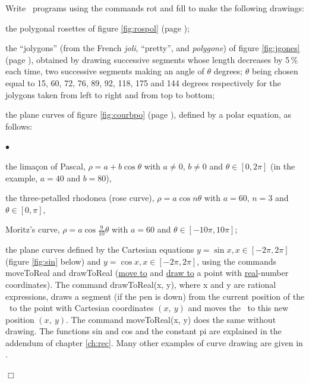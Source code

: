 \begin{exercices}{Write \python\ programs using the commands {\idt rot}
and {\idt fdl} to make the following drawings:

\tiret the polygonal rosettes of figure \ref{fig:rospol} (page \pageref{fig:rospol});

\tiret the ``jolygons'' (from the French {\em joli}, ``pretty'', and {\em polygone}) of figure \ref{fig:jgones} (page \pageref{fig:jgones}), obtained by drawing
successive segments whose length decreases by 5\,\% each time, two successive segments making
an angle of $\theta$ degrees; $\theta$ being chosen equal to 15, 60, 72, 76, 89, 92,
118, 175 and 144 degrees respectively
for the jolygons
taken from left
to right and from top to bottom;

\tiret the plane curves of figure \ref{fig:courbpo} (page \pageref{fig:courbpo}),
defined by a polar equation, as follows:
 \begin{list}{$\scriptscriptstyle\bullet$}{
}
   \item the limaçon of Pascal, $\rho = a + b \cos{\theta}$ with
   $a \neq 0$, $b \neq 0$ and $\theta \in [0, 2\pi]$ (in the example, $a = 40$ and $b = 80$),
   \item the three-petalled rhodonea (rose curve), $\rho = a \cos{n \theta}$ with
    $a = 60$, $n = 3$ and $\theta \in [0, \pi]$,
   \item Moritz's curve, $\rho = a \cos{\frac{9}{10} \theta}$ with
    $a = 60$ and $\theta \in [-10 \pi, 10 \pi]$;
   \end{list}

\tiret the plane curves defined by the Cartesian equations $y = \sin{x}, x \in [-2\pi, 2\pi]$
  (figure \ref{fig:sin} below) and $y = \cos{x}, x \in [-2\pi, 2\pi]$, using the commands {\idt moveToReal}
  and {\idt drawToReal} (\underline{move to} and \underline{draw to} a point with \underline{real}-number coordinates). The command {\idt drawToReal(x, y)},
  where {\idt x} and {\idt y} are rational expressions,
  draws a segment (if the pen is down) from the current position of the
  \robot\ to the point with Cartesian coordinates $(x,\ y)$ and moves the \robot\ to
  this new position $(x,\ y)$. The command {\idt moveToReal(x, y)} does the
  same without drawing. The functions {\idt sin} and {\idt cos} and the constant {\idt pi}
  are explained in the addendum of chapter \ref{ch:rec}.
   Many other examples of curve drawing are given in \cite{LT}.

\noindent $\Box$}\end{exercices}
